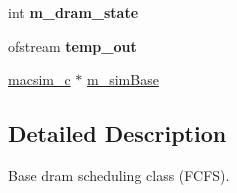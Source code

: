 \begin{DoxyCompactItemize}
\item 
\hypertarget{classdram__controller__c_a297088370cd5062c233fcab06c693022}{
int {\bfseries m\_\-dram\_\-state}}
\label{classdram__controller__c_a297088370cd5062c233fcab06c693022}

\item 
\hypertarget{classdram__controller__c_ac50ba6ff0ee2de611a2c2d2ca6210bbf}{
ofstream {\bfseries temp\_\-out}}
\label{classdram__controller__c_ac50ba6ff0ee2de611a2c2d2ca6210bbf}

\item 
\hyperlink{classmacsim__c}{macsim\_\-c} $\ast$ \hyperlink{classdram__controller__c_ae96442e89de273175e8d2ee453a2c688}{m\_\-simBase}
\end{DoxyCompactItemize}


\subsection{Detailed Description}
Base dram scheduling class (FCFS). 

